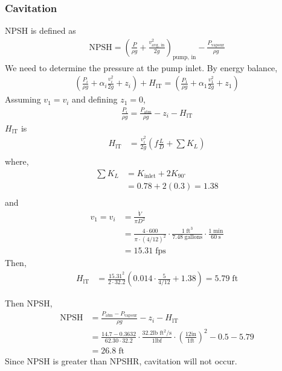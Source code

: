\subsubsection{Cavitation}
NPSH is defined as
\begin{align*}
    \text{NPSH} = \left(\frac{P}{\rho g} + \frac{v_\text{avg, in}^2}{2g}\right)_{\text{pump, in}} - \frac{P_\text{vapour}}{\rho g}
\end{align*}
We need to determine the pressure at the pump inlet. By energy balance,
\begin{align*}
    \left(\frac{P_i}{\rho g} + \alpha_i \frac{v_i^2}{2g} + z_i\right) + H_{\text{lT}} = \left(\frac{P_1}{\rho g} + \alpha_1 \frac{v_1^2}{2g} + z_1\right)
\end{align*}
Assuming $v_1 = v_i$ and defining $z_1 = 0$,
\begin{align*}
    \frac{P_i}{\rho g} = \frac{P_\text{atm}}{\rho g} - z_i - H_{\text{lT}}
\end{align*}
$H_{\text{lT}}$ is
\begin{align*}
    H_{\text{lT}} & = \frac{v_i^2}{2g} \left(f \frac{L}{D} + \sum K_L\right) \\
\end{align*}
where,
\begin{align*}
    \sum K_L & = K_\text{inlet} + 2K_{90^\circ} \\
             & = 0.78 + 2(0.3) = 1.38           \\
\end{align*}
and
\begin{align*}
    v_1 = v_i & = \frac{\dot{V}}{\pi D^2}                                                                                                                   \\
              & = \frac{4 \cdot 600}{\pi \cdot (4/12)^2} \cdot \frac{1 \; \text{ft}^3}{7.48 \; \text{gallons}} \cdot \frac{1 \; \text{min}}{60 \; \text{s}} \\
              & = 15.31 \; \text{fps}
\end{align*}
Then,
\begin{align*}
    H_{\text{lT}} & = \frac{15.31^2}{2 \cdot 32.2} \left(0.014 \cdot \frac{5}{4/12} + 1.38\right) = 5.79 \; \text{ft}
\end{align*}
\begin{framed}
    Then NPSH,
    \begin{align*}
        \text{NPSH} & = \frac{P_\text{atm} - P_\text{vapour}}{\rho g} - z_i - H_{\text{lT}}                                                                                             \\
                    & = \frac{14.7 - 0.3632}{62.30 \cdot 32.2} \cdot \frac{32.2 \text{lb ft}^2\text{/s}}{1 \text{lbf}} \cdot \left(\frac{12\text{in}}{1\text{ft}}\right)^2 - 0.5 - 5.79 \\
                    & = 26.8 \; \text{ft}
    \end{align*}
    Since NPSH is greater than NPSHR, cavitation will not occur.
\end{framed}

